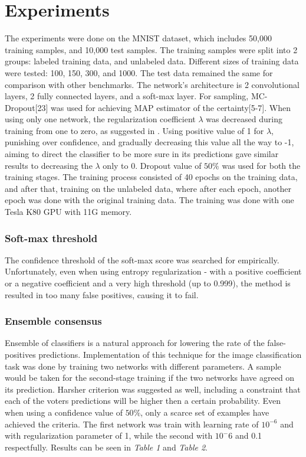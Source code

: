 \documentclass[conference, letterpaper]{IEEEtran}
\begin{document}
\section{Experiments}
The experiments were done on the MNIST dataset, which includes 50,000 training samples, and 10,000 test samples.
The training samples were split into 2 groups: labeled training data, and unlabeled data.
Different sizes of training data were tested: 100, 150, 300, and 1000.
The test data remained the same for comparison with other benchmarks.
The network's architecture is 2 convolutional layers, 2 fully connected layers, and a soft-max layer. For sampling, MC-Dropout[23] was used for achieving MAP estimator of the certainty[5-7].
When using only one network, the regularization coefficient $\lambda$ was decreased during training from one to zero, as suggested in \cite{grandvalet2005semi}. Using positive value of 1 for $\lambda$, punishing over confidence, and gradually decreasing this value all the way to -1, aiming to direct the classifier to be more sure in its predictions gave similar results to decreasing the $\lambda$ only to 0. Dropout value of $50\%$ was used for both the training stages.
The training process consisted of 40 epochs on the training data, and after that, training on the unlabeled data, where after each epoch, another epoch was done with the original training data. The training was done with one Tesla K80 GPU with 11G memory.

\subsubsection{Soft-max threshold}
The confidence threshold of the soft-max score was searched for empirically. Unfortunately, even when using entropy regularization - with a positive coefficient \cite{pereyra2017regularizing} or a negative coefficient \cite{grandvalet2005semi} and a very high threshold (up to 0.999), the method is resulted in too many false positives, causing it to fail.

\subsubsection{Ensemble consensus}
Ensemble of classifiers is a natural approach for lowering the rate of the false-positives predictions. Implementation of this technique for the image classification task was done by training two networks with different parameters. A sample would be taken for the second-stage training if the two networks have agreed on its prediction. Harsher criterion was suggested as well, including a constraint that each of the voters predictions will be higher then a certain probability. Even when using a confidence value of $50\%$, only a scarce set of examples have achieved the criteria. The first network was train with learning rate of $10^{-6}$ and with regularization parameter of 1, while the second with $10^-6$ and 0.1 respectfully. Results can be seen in \textit{Table 1} and \textit{Table 2}. 
\end{document}
